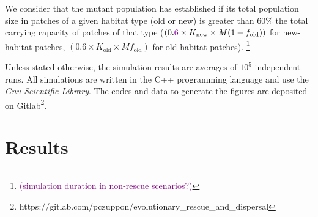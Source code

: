 \documentclass[11pt]{article}
\newcommand{\florence}[1]{\textcolor{purple}{(#1)}} %
\newcommand{\chg}[1]{\textcolor{change}{#1}}
\begin{document}

We consider that the mutant population has established if its total population size in patches of a given habitat type (old or new) is greater than $60\%$ the total carrying capacity of patches of that type ($(0.\chg{6} \times K_{\text{new}} \times M(1- f_{\text{old}}))$ for new-habitat patches, $(0.6\times K_{\text{old}}\times M f_{\text{old}})$  for old-habitat patches). \footnote{\florence{simulation duration in non-rescue scenarios?}}

Unless stated otherwise, the simulation results are averages of $10^5$ independent runs. All simulations are written in the C++ programming language and use the \textit{Gnu Scientific Library}. The codes and data to generate the figures are deposited on Gitlab\footnote{https://gitlab.com/pczuppon/evolutionary\_rescue\_and\_dispersal}.

\section*{Results}
\end{document}
